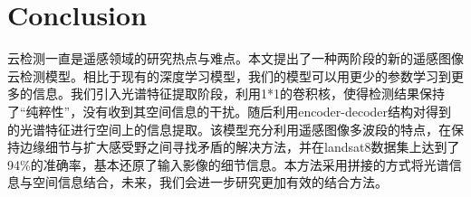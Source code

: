 \documentclass[UTF8]{ctexart}
\begin{document}
\section[]{Conclusion}
云检测一直是遥感领域的研究热点与难点。本文提出了一种两阶段的新的遥感图像云检测模型。相比于现有的深度学习模型，我们的模型可以用更少的参数学习到更多的信息。我们引入光谱特征提取阶段，利用1*1的卷积核，使得检测结果保持了“纯粹性”，没有收到其空间信息的干扰。随后利用encoder-decoder结构对得到的光谱特征进行空间上的信息提取。该模型充分利用遥感图像多波段的特点，在保持边缘细节与扩大感受野之间寻找矛盾的解决方法，并在landsat8数据集上达到了94\%的准确率，基本还原了输入影像的细节信息。本方法采用拼接的方式将光谱信息与空间信息结合，未来，我们会进一步研究更加有效的结合方法。


\end{document}
